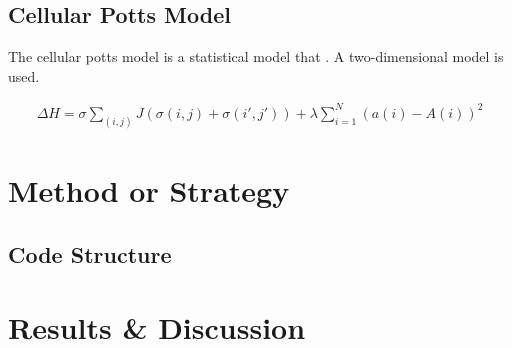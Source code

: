 \documentclass[a4paper,12pt]{article}
\begin{document}
\subsection{Cellular Potts Model}
The cellular potts model is a statistical model that . A two-dimensional model is used.


\begin{eqnarray}
\Delta H = \sigma \sum_{\left(i,j\right)} J\left(\sigma(i,j) + \sigma(i',j')\right) + \lambda \sum_{i=1}^{N} \left(a(i) - A(i)\right)^2
\end{eqnarray}


\section{Method or Strategy}

\subsection{Code Structure}

%
%
\section{Results \& Discussion}
\end{document}

